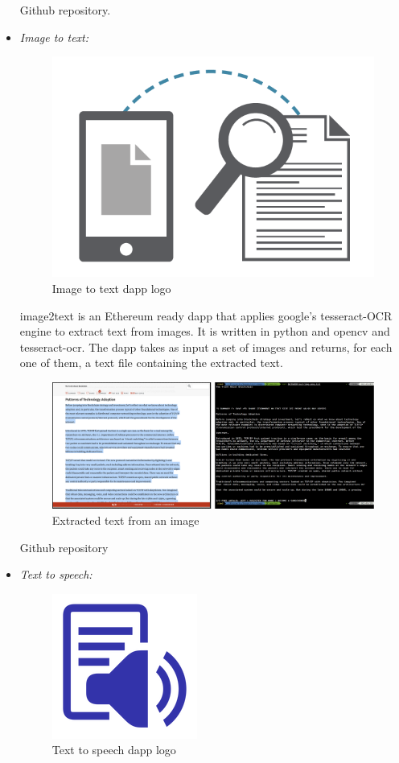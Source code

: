 \begin{itemize}
        Github repository\cite{object-detector}.

        \clearpage

        \item \textit{Image to text: }

        \begin{figure}[!h]\centering
            \includegraphics[width=.3\columnwidth]{6-Implementation/figs/image-to-text-logo.png}
            \caption{Image to text dapp logo}
        \end{figure}

        \vspace{50px}

        image2text is an Ethereum ready dapp that applies google's tesseract-OCR engine to extract
        text from images. It is written in python and opencv and tesseract-ocr. The dapp takes as
        input a set of images and returns, for each one of them, a text file containing the
        extracted text.

        \vspace{50px}

        \begin{figure}[!h]\centering
            \includegraphics[width=\columnwidth]{6-Implementation/figs/image-to-text-exp.png}
            \caption{Extracted text from an image}
        \end{figure}

        Github repository\cite{image-to-text}

        \clearpage

        \item \textit{Text to speech: }

        \begin{figure}[!h]\centering
            \includegraphics[width=.2\columnwidth]{6-Implementation/figs/text-to-speech-logo.png}
            \caption{Text to speech dapp logo}
        \end{figure}


\end{itemize}
